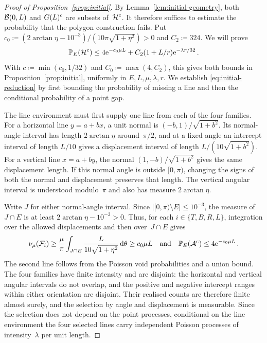 \documentclass[11pt,letterpaper]{article}
\begin{document}
\begin{proof}[Proof of Proposition~\ref{prop:initial}]
By Lemma~\ref{lem:initial-geometry}, both $\mathcal B(0,L)$ and $G(L)^{\mathrm{c}}$ are subsets of~$\mathcal H^{\mathrm{c}}$. It therefore suffices to estimate the probability that the polygon construction fails. Put $c_0\coloneqq(2\arctan\eta-10^{-3})/(10\pi\sqrt{1+\eta^2})>0$ and $C_2\coloneqq324$. We will prove
\begin{equation}\label{eq:initial-reduction}
  \mathbb P_E(\mathcal H^{\mathrm{c}})\le4\mathrm{e}^{-c_0\mu L}+C_2(1+L/r)\mathrm{e}^{-\lambda r/32}\,.
\end{equation}
With $c\coloneqq\min(c_0,1/32)$ and $C_0\coloneqq\max(4,C_2)$, this gives both bounds in Proposition~\ref{prop:initial}, uniformly in $E,L,\mu,\lambda,r$. We establish \eqref{eq:initial-reduction} by first bounding the probability of missing a line and then the conditional probability of a point gap.

The line environment must first supply one line from each of the four families. For a horizontal line $y=a+bx$, a unit normal is $(-b,1)/\sqrt{1+b^2}$. Its normal-angle interval has length $2\arctan\eta$ around~$\pi/2$, and at a fixed angle an intercept interval of length $L/10$ gives a displacement interval of length $L/(10\sqrt{1+b^2})$. For a vertical line $x=a+by$, the normal $(1,-b)/\sqrt{1+b^2}$ gives the same displacement length. If this normal angle is outside $[0,\pi)$, changing the signs of both the normal and displacement preserves that length. The vertical angular interval is understood modulo~$\pi$ and also has measure $2\arctan\eta$.

Write $J$ for either normal-angle interval. Since $\lvert[0,\pi)\setminus E\rvert\le10^{-3}$, the measure of $J\cap E$ is at least $2\arctan\eta-10^{-3}>0$. Thus, for each $i\in\{T,B,R,L\}$, integration over the allowed displacements and then over~$J\cap E$ gives
\begin{equation}\label{eq:initial-line-counts}
  \begin{aligned}
    \nu_\mu(\mathcal F_i)\ge\frac\mu\pi\int_{J\cap E}\frac{L}{10\sqrt{1+\eta^2}}\,\mathrm{d}\theta\ge c_0\mu L\quad\text{and}\quad    \mathbb P_E(\mathcal A^{\mathrm{c}})\le4\mathrm{e}^{-c_0\mu L}\,.
  \end{aligned}
\end{equation}
The second line follows from the Poisson void probabilities and a union bound. The four families have finite intensity and are disjoint: the horizontal and vertical angular intervals do not overlap, and the positive and negative intercept ranges within either orientation are disjoint. Their realised counts are therefore finite almost surely, and the selection by angle and displacement is measurable. Since the selection does not depend on the point processes, conditional on the line environment the four selected lines carry independent Poisson processes of intensity~$\lambda$ per unit length.


\end{proof}
\end{document}
